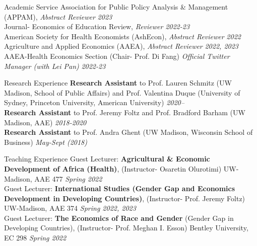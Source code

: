 \documentclass{resume} %
\begin{document}
\begin{rSection}{Academic Service}%
Association for Public Policy Analysis \& Management (APPAM),  \textit{Abstract Reviewer}  {\hfill \em 2023} \\
Journal- Economics of Education Review, \textit{Reviewer} {\hfill\textit{2022-23}} \\ 
American Society for Health Economists (AshEcon), \textit{Abstract Reviewer} {\hfill\textit{2022}} \\ 
Agriculture and Applied Economics (AAEA), \textit{Abstract Reviewer} {\hfill \textit{2022, 2023}}\\
AAEA-Health Economics Section (Chair- Prof. Di Fang) \textit{Official Twitter Manager (with Lei Pan)} {\hfill \textit{2022-23}}  
\end{rSection}



\begin{rSection}{Research Experience}
\textbf{Research Assistant} to Prof. Lauren Schmitz (UW Madison, School of Public Affairs) and Prof. Valentina Duque (University of Sydney, Princeton University, American University) \hfill \textit{2020--} \\
\textbf{Research Assistant} to Prof. Jeremy Foltz and Prof. Bradford Barham (UW Madison, AAE) \hfill \textit{2018-2020} \\
\textbf{Research Assistant} to Prof. Andra Ghent (UW Madison, Wisconsin School of Business) \hfill \textit{May-Sept (2018)}
\end{rSection}


\begin{rSection}{Teaching Experience}
Guest Lecturer: \textbf{Agricultural \& Economic Development of Africa (Health)}, (Instructor- Osaretin Olurotimi) UW-Madison, AAE 477
 \hfill \textit{Spring 2022} \\
Guest Lecturer: \textbf{International Studies (Gender Gap and Economics Development in Developing Countries)}, (Instructor- Prof. Jeremy Foltz) UW-Madison, AAE 374
 \hfill \textit{Spring 2022, 2023} \\
Guest Lecturer: \textbf{The Economics of Race and Gender} (Gender Gap in Developing Countries), (Instructor- Prof. Meghan I. Esson) Bentley University, EC 298
 \hfill \textit{Spring 2022}
\end{rSection}
\end{document}
